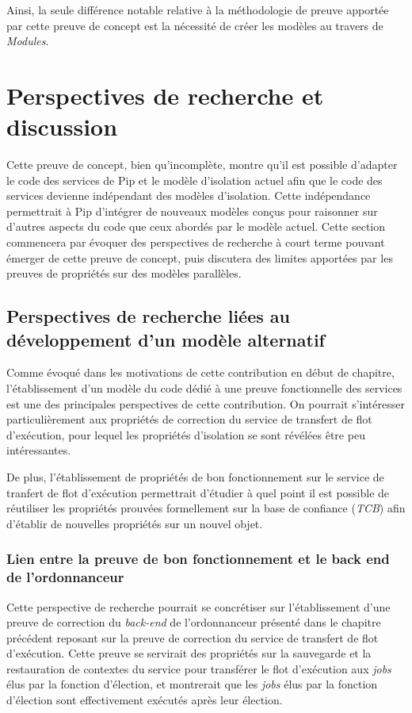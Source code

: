 		Ainsi, la seule différence notable relative à la méthodologie de preuve apportée par cette preuve de concept est la nécessité de créer les modèles au travers de \emph{Modules}.

	\section{Perspectives de recherche et discussion}
		Cette preuve de concept, bien qu'incomplète, montre qu'il est possible d'adapter le code des services de Pip et le modèle d'isolation actuel afin que le code des services devienne indépendant des modèles d'isolation. Cette indépendance permettrait à Pip d'intégrer de nouveaux modèles conçus pour raisonner sur d'autres aspects du code que ceux abordés par le modèle actuel. Cette section commencera par évoquer des perspectives de recherche à court terme pouvant émerger de cette preuve de concept, puis discutera des limites apportées par les preuves de propriétés sur des modèles parallèles.

		\subsection{Perspectives de recherche liées au développement d'un modèle alternatif}
		Comme évoqué dans les motivations de cette contribution en début de chapitre, l'établissement d'un modèle du code dédié à une preuve fonctionnelle des services est une des principales perspectives de cette contribution. On pourrait s'intéresser particulièrement aux propriétés de correction du service de transfert de flot d'exécution, pour lequel les propriétés d'isolation se sont révélées être peu intéressantes.

		De plus, l'établissement de propriétés de bon fonctionnement sur le service de tranfert de flot d'exécution permettrait d'étudier à quel point il est possible de réutiliser les propriétés prouvées formellement sur la base de confiance (\emph{TCB}) afin d'établir de nouvelles propriétés sur un nouvel objet. 
		\subsubsection{Lien entre la preuve de bon fonctionnement et le back end de l'ordonnanceur}
		
		Cette perspective de recherche pourrait se concrétiser sur l'établissement d'une preuve de correction du \emph{back-end} de l'ordonnanceur présenté dans le chapitre précédent reposant sur la preuve de correction du service de transfert de flot d'exécution. Cette preuve se servirait des propriétés sur la sauvegarde et la restauration de contextes du service pour transférer le flot d'exécution aux \emph{jobs} élus par la fonction d'élection, et montrerait que les \emph{jobs} élus par la fonction d'élection sont effectivement exécutés après leur élection.


